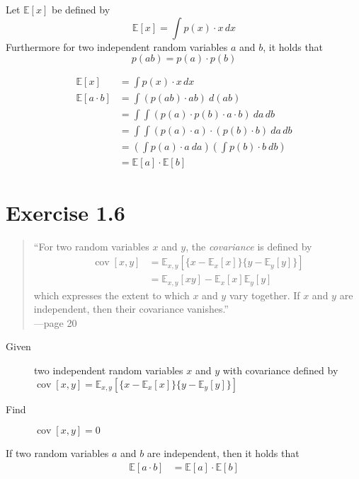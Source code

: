 \documentclass[a4paper]{article}
\newcommand\E{\mathbb{E}}
\DeclareMathOperator\cov{cov}
\begin{document}
Let $\E[x]$ be defined by
\[ \E[x] = \int p(x) \cdot x \, dx \]
Furthermore for two independent random variables $a$ and $b$, it holds that
\[ p(ab) = p(a) \cdot p(b) \]

\begin{align*}
  \E[x] &= \int p(x) \cdot x \, dx \\
  \E[a \cdot b]
    &= \int \left( p(ab) \cdot ab \right) \: d(ab) \\
    &= \int \int \left( p(a) \cdot p(b) \cdot a \cdot b \right)   \: da \, db \\
    &= \int \int \left( p(a) \cdot a \right)  \cdot \left(p(b) \cdot b\right)  \: da \, db \\
    &= \left(\int p(a) \cdot a \: da\right) \left(\int p(b) \cdot b  \: db\right) \\
    &= \E[a] \cdot \E[b]
\end{align*}

\section{Exercise 1.6}

\begin{quote}
  \enquote{For two random variables $x$ and $y$, the \emph{covariance} is defined by
  \begin{align*}
    \cov{[x,y]} &= \E_{x,y}[\{x - \E_{x}[x]\}\{y - \E_{y}[y]\}] \\
                &= \E_{x,y}[xy] - \E_{x}[x] \E_{y}[y]
  \end{align*}
  which expresses the extent to which $x$ and $y$ vary together.
  If $x$ and $y$ are independent, then their covariance vanishes.} \\
  ---page 20
\end{quote}

\begin{description}
  \item[Given] two independent random variables $x$ and $y$ with covariance defined by $\cov[x,y] = \E_{x,y}[\{x - \E_{x}[x]\}\{y - \E_{y}[y]\}]$
  \item[Find] $\cov[x,y] = 0$
\end{description}

If two random variables $a$ and $b$ are independent, then it holds that
\begin{align}
  \E[a \cdot b] &= \E[a] \cdot \E[b]       \label{eq:e-2-multi}
\end{align}
\end{document}
